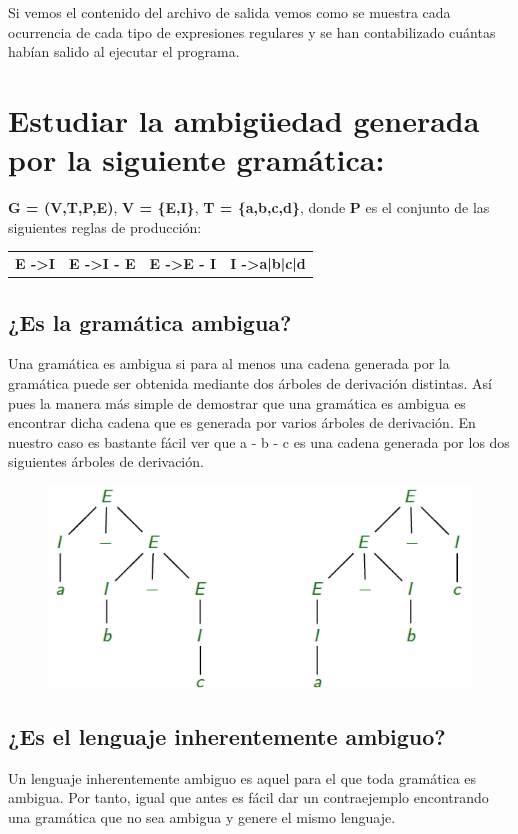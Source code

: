 Si vemos el contenido del archivo de salida vemos como se muestra cada ocurrencia de cada tipo de expresiones regulares y se han contabilizado cuántas habían salido al ejecutar el programa.

\section{Estudiar la ambigüedad generada por la siguiente gramática:}
\textbf{G = (V,T,P,E)}, \textbf{V = \{E,I\}}, \textbf {T = \{a,b,c,d\}}, donde \textbf{P} es el conjunto de las siguientes reglas de producción: \newline

\begin{table}[H]
	\centering
	\begin{tabular}{cccc}
		\textbf{E -\textgreater\space I} & \textbf{E -\textgreater\space I - E} & \textbf{E -\textgreater\space E - I} & \textbf{I -\textgreater\space a|b|c|d}
	\end{tabular}
\end{table}
\subsection{¿Es la gramática ambigua?}
Una gramática es ambigua si para al menos una cadena generada por la gramática puede ser obtenida mediante dos árboles de derivación distintas. Así pues la manera más simple de demostrar que una gramática es ambigua es encontrar dicha cadena que es generada por varios árboles de derivación. En nuestro caso es bastante fácil ver que a - b - c es una cadena generada por los dos siguientes árboles de derivación.

\begin{figure}[H]
	\centering
	\includegraphics[scale=1.0]{arbol.png}
\end{figure}

\subsection{¿Es el lenguaje inherentemente ambiguo?}
Un lenguaje inherentemente ambiguo es aquel para el que toda gramática es ambigua. Por tanto, igual que antes es fácil dar un contraejemplo encontrando una gramática que no sea ambigua y genere el mismo lenguaje.
